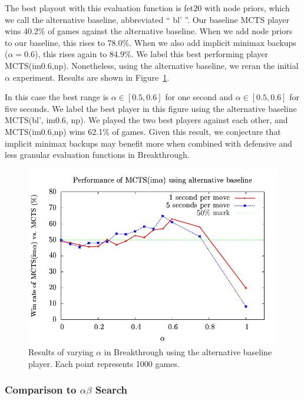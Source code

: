 \documentclass[conference]{IEEEtran}
\begin{document}
The best playout with this evaluation function is fet$20$ with node priors, which we call the alternative baseline, 
abbreviated `` bl' ''.
Our baseline MCTS player wins 40.2\% of games against the alternative baseline. 
When we add node priors to our baseline, this rises to 78.0\%. 
When we also add implicit minimax backups ($\alpha = 0.6$), this rises again to 84.9\%. 
We label this best performing player MCTS(im$0.6$,np). 
Nonetheless, using the alternative baseline, we reran the initial $\alpha$ experiment. 
Results are shown in Figure~\ref{fig:bt-alt-alpha}. 

In this case the best range is $\alpha \in [0.5,0.6]$ for one second and $\alpha \in [0.5,0.6]$ for
five seconds.
We label the best player in this figure using the alternative baseline MCTS(bl', im$0.6$, np). 
We played the two best players against each other, and MCTS(im$0.6$,np) wins 62.1\% of games. 
Given this result, we conjecture that implicit minimax backups may benefit more when combined with 
defensive and less granular evaluation functions in Breakthrough.

\begin{figure}[t]
\begin{center}
\includegraphics[scale=0.68]{plots/bt-alt-alpha}
\caption{Results of varying $\alpha$ in Breakthrough using the alternative baseline player.
Each point represents 1000 games.} 
\label{fig:bt-alt-alpha}
\end{center}
\end{figure}

\subsubsection*{Comparison to $\alpha\beta$ Search}
\end{document}
